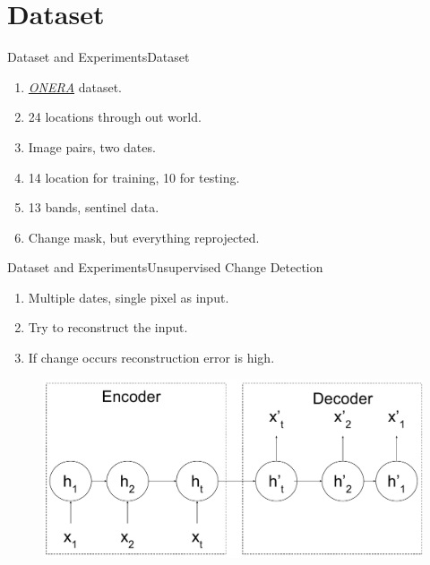\documentclass[handout]{beamer}
\begin{document}
\section{Dataset}
\begin{frame}{Dataset and Experiments}{Dataset}
  \begin{enumerate}
    \item \href{https://rcdaudt.github.io/oscd/}{\color{blue}\textit{ONERA}} dataset.
    \item 24 locations through out world.
    \item Image pairs, two dates.
    \item 14 location for training, 10 for testing.
    \item 13 bands, sentinel data.
    \item Change mask, but everything reprojected.
  \end{enumerate}
\end{frame}

\begin{frame}{Dataset and Experiments}{Unsupervised Change Detection}
  \begin{enumerate}
    \item Multiple dates, single pixel as input.
    \item Try to reconstruct the input.
    \item If change occurs reconstruction error is high.
  \end{enumerate}
  \begin{center}
    \begin{figure}
    \includegraphics[scale=0.35]{images/rnn_enc_dec}
    \end{figure}
  \end{center}
\end{frame}
\end{document}
